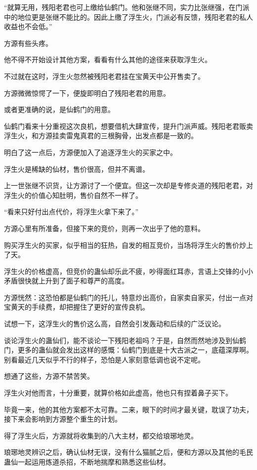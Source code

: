 \begin{this_body}
“就算无用，残阳老君也可上缴给仙鹤门。他和张继不同，实力比张继强，在门派中的地位更是张继不能比的。因此上缴了浮生火，门派必有反馈，残阳老君的私人收益也不会低。”

方源有些头疼。

他不得不开始设计其他方案，看看有什么其他的途径来获取浮生火。

不过就在这时，浮生火忽然被残阳老君挂在宝黄天中公开售卖了。

方源微微惊愕了一下，便旋即明白了残阳老君的用意。

或者更准确的说，是仙鹤门的用意。

仙鹤门看来十分重视这次良机，想要借机大肆宣传，提升门派声威。残阳老君贩卖浮生火，和方源挂卖雷鬼真君的三根胸骨，出发点都是一致的。

明白了这一点后，方源便加入了追逐浮生火的买家之中。

浮生火是稀缺的仙材，售价很高，但并不离谱。

上一世张继不识货，让方源讨了一个便宜。但这一次却是专修炎道的残阳老君，对浮生火的价值心知肚明，售价自然不一样了。

“看来只好付出点代价，将浮生火拿下来了。”

方源心里有所准备，但接下来的竞价，则再一次出乎了他的意料。

购买浮生火的买家，似乎相当的狂热，自发的相互竞价，当场将浮生火的售价炒上了天。

浮生火的价格虚高，但竞价的蛊仙却乐此不疲，吵得面红耳赤，言语上交锋的小小矛盾很快就上升到了面子和尊严的高度。

方源恍然：这恐怕都是仙鹤门的托儿，特意炒出高价，自家卖自家买，付出一点对宝黄天的手续费，却把握住了更好的宣传良机。

试想一下，这浮生火的售价这么高，自然会引发轰动和后续的广泛议论。

谈论浮生火的蛊仙们，能不谈论一下残阳老祖吗？于是，自然而然地涉及到仙鹤门，更多的蛊仙就会发出这样的感慨：仙鹤门到底是十大古派之一，底蕴深厚啊。别看最近几天似乎不行的样子，恐怕是人家刻意低调也说不定呢。

想通了这些，方源不禁苦笑。

浮生火对他而言，十分重要，就算价格如此虚高，他也只有捏着鼻子买下。

毕竟一来，他的其他方案都不太可靠。二来，眼下的时间才最关键，耽误了功夫，接下来会影响到方源整个重生的计划。

得了浮生火后，方源就将收集到的八大主材，都交给琅琊地灵。

琅琊地灵辨识之后，确认仙材无误，没有什么猫腻之后，便和方源以及其他的毛民蛊仙一起运用炼道杀招，不断地揣摩和熟悉这些仙材。


\end{this_body}
